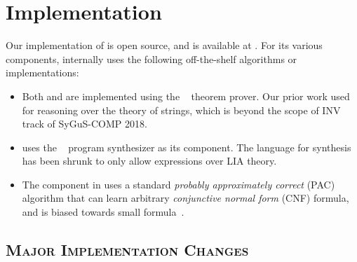 \documentclass[conference]{IEEEtran}
\begin{document}
\section{Implementation} \label{subsec:Implementation}

\noindent
Our implementation of \LoopInvGen is open source, and is available at .
For its various components, \LoopInvGen internally uses the following off-the-shelf algorithms or implementations:
\begin{itemize}
    \item Both \GetModel and \Checker are implemented using the ~\cite{Moura2008Z3AE} theorem prover.
          Our prior work used ~\cite{Barrett2011CVC4} for reasoning over the theory of strings,
          which is beyond the scope of INV track of SyGuS-COMP 2018.
    
    \item \PIE uses the ~\cite{Albarghouthi2013RecursivePS} program synthesizer as its \Synth component.
          The language for synthesis has been shrunk to only allow expressions over LIA theory.
    
    \item The \BFL component in \PIE uses a standard \emph{probably approximately correct} (PAC) algorithm
          that can learn arbitrary \emph{conjunctive normal form} (CNF) formula,
          and is biased towards small formula~\cite{Kearns1994AnIT}.
\end{itemize}

\subsection*{\textsc{Major Implementation Changes}}
\end{document}

